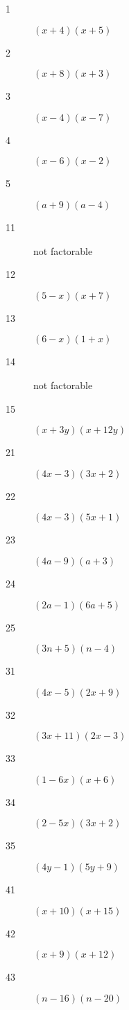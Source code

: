\documentclass[letterpaper, landscape]{exam}
\begin{document}
    \begin{description}
      \item[1] $(x + 4)(x + 5)$

      \item[2] $(x + 8)(x + 3)$

      \item[3] $(x - 4)(x - 7)$

      \item[4] $(x - 6)(x - 2)$

      \item[5] $(a + 9)(a - 4)$

      \item[11] not factorable

      \item[12] $(5 - x)(x + 7)$

      \item[13] $(6 - x)(1 + x)$

      \item[14] not factorable

      \item[15] $(x + 3y)(x + 12y)$

      \item[21] $(4x - 3)(3x + 2)$

      \item[22] $(4x - 3)(5x + 1)$

      \item[23] $(4a - 9)(a + 3)$

      \item[24] $(2a - 1)(6a + 5)$

      \item[25] $(3n + 5)(n - 4)$

      \item[31] $(4x - 5)(2x + 9)$

      \item[32] $(3x + 11)(2x - 3)$

      \item[33] $(1 - 6x)(x + 6)$

      \item[34] $(2 -5x)(3x + 2)$

      \item[35] $(4y - 1)(5y + 9)$

      \item[41] $(x + 10)(x + 15)$

      \item[42] $(x + 9)(x + 12)$

      \item[43] $(n - 16)(n - 20)$


\end{description}
\end{document}
